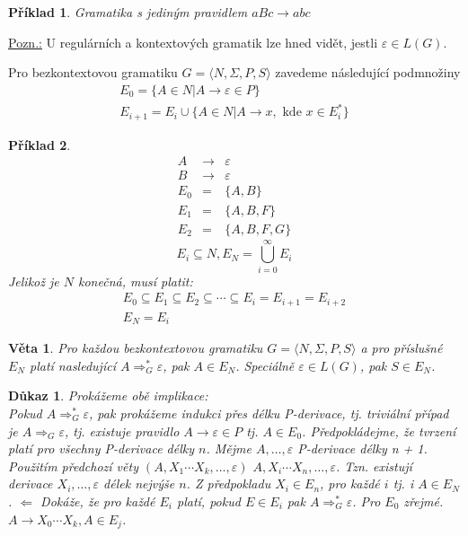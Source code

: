 \documentclass[10pt, a4paper, titlepage]{article}
\theoremstyle{note}
\newtheorem{veta}{\textbf{Věta}}
\newtheorem{dukaz}{\textbf{Důkaz}}
\newtheorem{priklad}{\textbf{Příklad}}
\begin{document}
\begin{priklad}
Gramatika s jediným pravidlem $aBc \rightarrow abc$
\end{priklad}

\underline{Pozn.:} U regulárních a kontextových gramatik lze hned vidět, jestli $\varepsilon \in L(G)$.

Pro bezkontextovou gramatiku $G = \langle N, \Sigma, P,S \rangle$ zavedeme následující podmnožiny
\begin{gather*}
E_{0} = \lbrace A \in N | A \rightarrow \varepsilon \in P \rbrace \\
E_{i+1} = E_{i} \cup \lbrace A \in N | A \rightarrow x, \text{ kde } x \in E_{i}^* \rbrace
\end{gather*}

\begin{priklad}
\begin{eqnarray*}
A &\rightarrow& \varepsilon \\
B &\rightarrow& \varepsilon \\
E_{0} &=& \lbrace A, B \rbrace \\
E_{1} &=& \lbrace A, B, F \rbrace \\
E_{2} &=& \lbrace A, B, F, G \rbrace
\end{eqnarray*}
$$
E_{i} \subseteq N, E_{N} = \bigcup_{i=0}^{\infty} E_{i}
$$
Jelikož je $N$ konečná, musí platit:
\begin{gather*}
E_{0} \subseteq E_{1} \subseteq E_{2} \subseteq \cdots \subseteq E_{i} = E_{i+1} = E_{i+2} \\
E_{N} = E_{i}
\end{gather*}
\end{priklad}

\begin{veta}
Pro každou bezkontextovou gramatiku $G = \langle N, \Sigma, P,S \rangle$ a pro příslušné $E_{N}$ platí nasledující $A \Rightarrow_{G}^{*}\varepsilon$, pak $A \in E_{N}$. 
Speciálně $\varepsilon \in L(G)$, pak $S \in E_{N}$.
\end{veta}

\begin{dukaz}
Prokážeme obě implikace: \\
Pokud $A \Rightarrow_{G}^{*}\varepsilon$, pak prokážeme indukci přes délku P-derivace, tj. triviální případ je $A \Rightarrow_{G}\varepsilon$, 
tj. existuje pravidlo $A \rightarrow \varepsilon \in P$ tj. $A \in E_{0}$.
Předpokládejme, že tvrzení platí pro všechny P-derivace délky $n$.
Mějme $A, \ldots, \varepsilon$ P-derivace délky n + 1. Použitím předchozí věty $(A, X_{1} \cdots X_{k}, \ldots, \varepsilon)$ $A, X_{i} \cdots X_{n}, \ldots, \varepsilon$.
Tzn. existují derivace $X_{i}, \ldots, \varepsilon$ délek nejvýše $n$. Z předpokladu $X_{i} \in E_{n}$, pro každé $i$ tj. i $A \in E_{N}$. 
$\Leftarrow$ Dokáže, že pro každé $E_{i}$ platí, pokud $E \in E_{i}$ pak $A \Rightarrow_{G}^{*}\varepsilon$. Pro $E_{0}$ zřejmé.
$A \rightarrow X_{0} \cdots X_{k}, A \in E_{j}$.
\end{dukaz}
\end{document}
